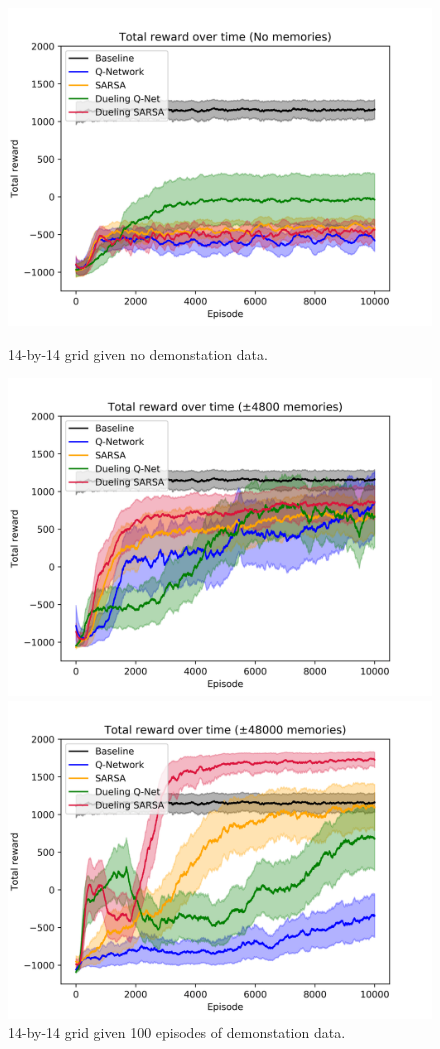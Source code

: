 \begin{figure}[H]
    \centering
    \includegraphics[width=\linewidth]{img/results/14-sized/total_rewards_0m-min.png}
    \caption{14-by-14 grid given no demonstation data.}
    \label{fig:old-14sized-nomem}
    \includegraphics[width=\linewidth]{img/results/14-sized/total_rewards_100m-min.png}
    \caption{14-by-14 grid given 100 episodes of demonstation data.}
    \label{fig:old-14sized-100mem}
    \includegraphics[width=\linewidth]{img/results/14-sized/total_rewards_1000m-min.png}

\end{figure}
